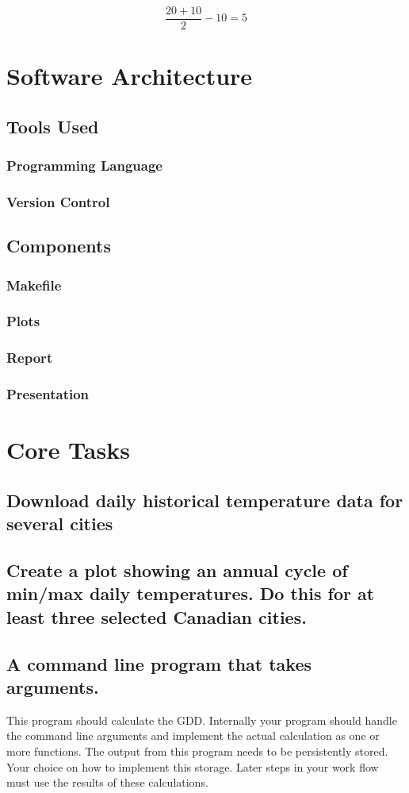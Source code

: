 \documentclass{article}
\begin{document}
\[ \frac {20+10}{2}-10=5 \] \par


\noindent
\section{ \bf Software Architecture}
\subsection{Tools Used}
\subsubsection{Programming Language}
\subsubsection{Version Control}
\subsection{Components}
\subsubsection{Makefile}
\subsubsection{Plots}
\subsubsection{Report}
\subsubsection{Presentation}

\section{ \bf Core Tasks}
\subsection{Download daily historical temperature data for several cities}
\subsection{Create a plot showing an annual cycle of min/max daily temperatures. Do this for at least three selected Canadian cities.}
\subsection{A command line program that takes arguments.}
This program should calculate the GDD. Internally your program should handle the command line arguments and implement the actual calculation as one or more functions. The output from this program needs to be persistently stored. Your choice on how to implement this storage. Later steps in your work flow must use the results of these calculations.
\end{document}
